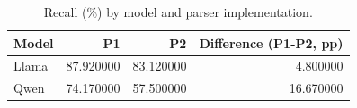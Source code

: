 \begin{table}[t]
\caption{Recall (\%) by model and parser implementation.}
\label{tab:model_parser}
\begin{tabular}{lrrr}
\toprule
Model & P1 & P2 & Difference (P1-P2, pp) \\
\midrule
Llama & 87.920000 & 83.120000 & 4.800000 \\
Qwen & 74.170000 & 57.500000 & 16.670000 \\
\bottomrule
\end{tabular}
\end{table}
